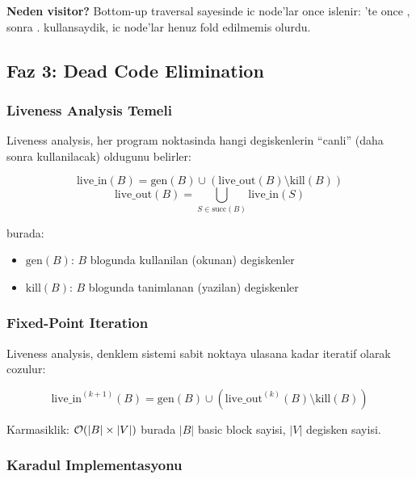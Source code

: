 \textbf{Neden  visitor?} Bottom-up traversal sayesinde ic node'lar once islenir: 'te once , sonra .  kullansaydik, ic node'lar henuz fold edilmemis olurdu.


\subsection{Faz 3: Dead Code Elimination}
\label{sec:phase3-dce}

\subsubsection{Liveness Analysis Temeli}

Liveness analysis, her program noktasinda hangi degiskenlerin ``canli'' (daha sonra kullanilacak) oldugunu belirler:

\begin{equation}
\text{live\_in}(B) = \text{gen}(B) \cup (\text{live\_out}(B) \setminus \text{kill}(B))
\label{eq:live-in}
\end{equation}
\begin{equation}
\text{live\_out}(B) = \bigcup_{S \in \text{succ}(B)} \text{live\_in}(S)
\label{eq:live-out}
\end{equation}

burada:
\begin{itemize}
\item $\text{gen}(B)$: $B$ blogunda kullanilan (okunan) degiskenler
\item $\text{kill}(B)$: $B$ blogunda tanimlanan (yazilan) degiskenler
\end{itemize}

\subsubsection{Fixed-Point Iteration}

Liveness analysis, denklem sistemi sabit noktaya ulasana kadar iteratif olarak cozulur:

\begin{equation}
\text{live\_in}^{(k+1)}(B) = \text{gen}(B) \cup \left(\text{live\_out}^{(k)}(B) \setminus \text{kill}(B)\right)
\end{equation}

Karmasiklik: $\mathcal{O}\!\left(|B| \times |V|\right)$ burada $|B|$ basic block sayisi, $|V|$ degisken sayisi.

\subsubsection{Karadul Implementasyonu}

